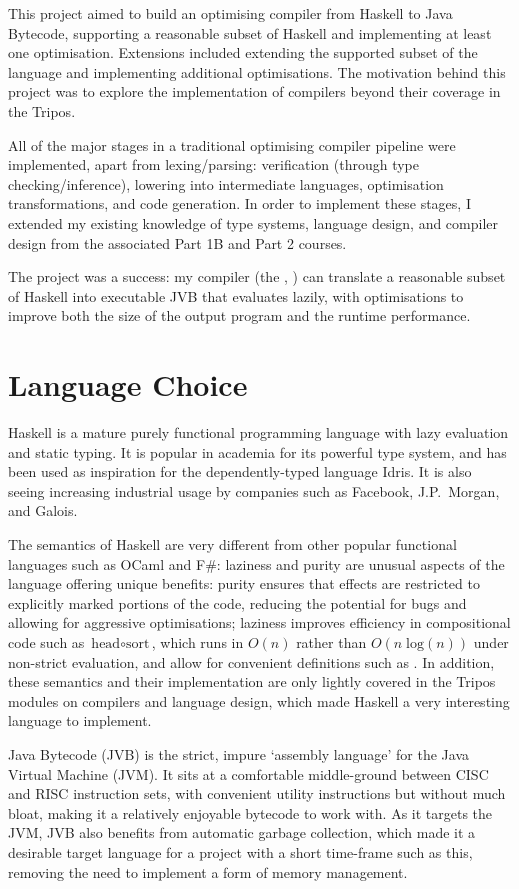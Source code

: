 \documentclass[dissertation.tex]{subfiles}
\begin{document}
This project aimed to build an optimising compiler from Haskell to Java Bytecode, supporting a reasonable subset of Haskell and implementing at least one optimisation. Extensions included extending the supported subset of the language and implementing additional optimisations. The motivation behind this project was to explore the implementation of compilers beyond their coverage in the Tripos.

All of the major stages in a traditional optimising compiler pipeline were implemented, apart from lexing/parsing: verification (through type checking/inference), lowering into intermediate languages, optimisation transformations, and code generation. In order to implement these stages, I extended my existing knowledge of type systems, language design, and compiler design from the associated Part 1B and Part 2 courses.

The project was a success: my compiler (the \compilerlongname, \compilername) can translate a reasonable subset of Haskell into executable JVB that evaluates lazily, with optimisations to improve both the size of the output program and the runtime performance.

\section{Language Choice}
{
    Haskell is a mature purely functional programming language with lazy evaluation and static typing. It is popular in academia for its powerful type system, and has been used as inspiration for the dependently-typed language Idris\cite{Idris}. It is also seeing increasing industrial usage by companies such as Facebook\cite{FacebookHaskell}, J.P.\ Morgan\cite{JPHaskell}, and Galois\cite{GaloisHaskell}.

    The semantics of Haskell are very different from other popular functional languages such as OCaml and F\#: laziness and purity are unusual aspects of the language offering unique benefits: purity ensures that effects are restricted to explicitly marked portions of the code, reducing the potential for bugs and allowing for aggressive optimisations; laziness improves efficiency in compositional code such as \(\text{head} \circ \text{sort}\), which runs in \(O(n)\) rather than \(O(n\;\text{log}(n))\) under non-strict evaluation, and allow for convenient definitions such as . In addition, these semantics and their implementation are only lightly covered in the Tripos modules on compilers and language design, which made Haskell a very interesting language to implement.

    Java Bytecode (JVB) is the strict, impure `assembly language' for the Java Virtual Machine (JVM). It sits at a comfortable middle-ground between CISC and RISC instruction sets, with convenient utility instructions but without much bloat, making it a relatively enjoyable bytecode to work with. As it targets the JVM, JVB also benefits from automatic garbage collection, which made it a desirable target language for a project with a short time-frame such as this, removing the need to implement a form of memory management.
}
\end{document}
